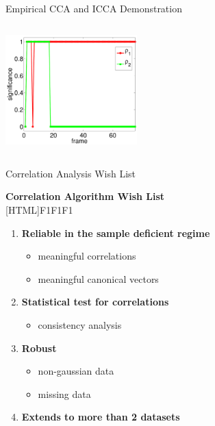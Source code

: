 \documentclass[8pt]{beamer}
\begin{document}
\begin{frame}{Empirical CCA and ICCA Demonstration}
\begin{columns}[T]
\begin{column}{1\textwidth}
\begin{center}
        \hspace{2ex}
        \includegraphics[width=0.38\textwidth]{figures/av_icca_sig_zoom.pdf}
    \end{center}
  \end{column}
  \end{columns}


\end{frame}

\begin{frame}{Correlation Analysis Wish List}
  \addtocounter{framenumber}{-1}

  \begin{center}
    \textbf{Correlation Algorithm Wish List}\\[1ex]
[HTML]{F1F1F1}{\parbox{0.8\textwidth}{%
    \begin{enumerate}
    \item \textbf{Reliable in the sample deficient regime}
      \begin{itemize}
      \item {\textcolor{texthigh}{meaningful correlations \checkmark}}
      \item meaningful canonical vectors
      \end{itemize}
    \item {\textcolor{texthigh}{\textbf{Statistical test for correlations} \checkmark}}
      \begin{itemize}
      \item {\textcolor{texthigh}{consistency analysis \checkmark}}
      \end{itemize}
    \item \textbf{Robust}
      \begin{itemize}
      \item non-gaussian data
      \item missing data
      \end{itemize}
    \item \textbf{Extends to more than 2 datasets}
    \end{enumerate}
}}
\end{center}

\end{frame}
\end{document}

